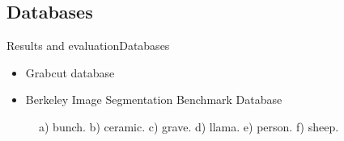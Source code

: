 \documentclass[10pt]{beamer}
\begin{document}
\subsection{Databases}
\begin{frame}{Results and evaluation}{Databases}
\begin{itemize}
	\item Grabcut database
    \item Berkeley Image Segmentation Benchmark Database
\end{itemize}
\vspace{-0.1cm}
\begin{figure}[H]
  \centering
  \qquad
  \qquad
\end{figure}
\vspace{-0.5cm}
\begin{figure}[H]
  \centering
  \qquad
  \qquad
  \caption{a) bunch. b) ceramic. c) grave. d) llama. e) person. f) sheep.}
\end{figure}

\end{frame}
\end{document}
